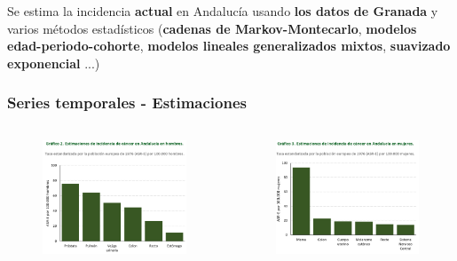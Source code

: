 \documentclass{beamer}
\begin{document}
\begin{frame}
	\centering
	Se estima la incidencia \textbf{actual} en Andalucía usando \textbf{los datos de Granada} y varios métodos estadísticos (\textbf{cadenas de Markov-Montecarlo}, \textbf{modelos edad-periodo-cohorte}, \textbf{modelos lineales generalizados mixtos}, \textbf{suavizado exponencial} ...)
\end{frame}


\begin{frame}\frametitle{Series temporales - Estimaciones}
	\begin{columns}
		\begin{column}{0.5\textwidth}
			\begin{figure}
				\centering
				\includegraphics[width=\textwidth]{images/estimaciones_hombres.png}
			\end{figure}
		\end{column}
		\begin{column}{0.5\textwidth}
			\begin{figure}
				\centering
				\includegraphics[width=\textwidth]{images/estimaciones_mujeres.png}

\end{figure}
\end{column}
\end{columns}
\end{frame}
\end{document}
